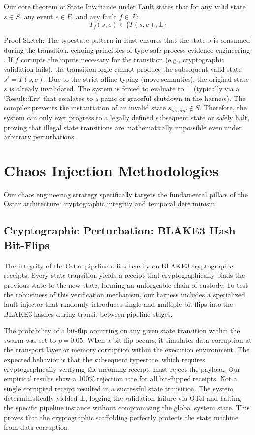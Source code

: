 Our core theorem of State Invariance under Fault states that for any valid state $s \in S$, any event $e \in E$, and any fault $f \in \mathcal{F}$:
$$ T_f(s, e) \in \{ T(s, e), \bot \} $$

Proof Sketch:
The typestate pattern in Rust ensures that the state $s$ is consumed during the transition, echoing principles of type-safe process evidence engineering \cite{ref_TypeSafeProcess48}. If $f$ corrupts the inputs necessary for the transition (e.g., cryptographic validation fails), the transition logic cannot produce the subsequent valid state $s' = T(s, e)$. Due to the strict affine typing (move semantics), the original state $s$ is already invalidated. The system is forced to evaluate to $\bot$ (typically via a `Result::Err` that escalates to a panic or graceful shutdown in the harness). The compiler prevents the instantiation of an invalid state $s_{invalid} \notin S$. Therefore, the system can only ever progress to a legally defined subsequent state or safely halt, proving that illegal state transitions are mathematically impossible even under arbitrary perturbations.

\section{Chaos Injection Methodologies}

Our chaos engineering strategy specifically targets the fundamental pillars of the Ostar architecture: cryptographic integrity and temporal determinism. 

\subsection{Cryptographic Perturbation: BLAKE3 Hash Bit-Flips}

The integrity of the Ostar pipeline relies heavily on BLAKE3 cryptographic receipts. Every state transition yields a receipt that cryptographically binds the previous state to the new state, forming an unforgeable chain of custody. To test the robustness of this verification mechanism, our harness includes a specialized fault injector that randomly introduces single and multiple bit-flips into the BLAKE3 hashes during transit between pipeline stages. 

The probability of a bit-flip occurring on any given state transition within the swarm was set to $p = 0.05$. When a bit-flip occurs, it simulates data corruption at the transport layer or memory corruption within the execution environment. The expected behavior is that the subsequent typestate, which requires cryptographically verifying the incoming receipt, must reject the payload. Our empirical results show a 100\% rejection rate for all bit-flipped receipts. Not a single corrupted receipt resulted in a successful state transition. The system deterministically yielded $\bot$, logging the validation failure via OTel and halting the specific pipeline instance without compromising the global system state. This proves that the cryptographic scaffolding perfectly protects the state machine from data corruption.

